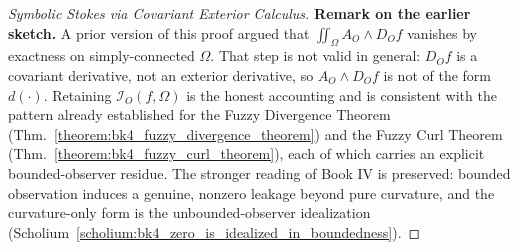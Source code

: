 \begin{proof}[Symbolic Stokes via Covariant Exterior Calculus]
\textbf{Remark on the earlier sketch.} A prior version of this proof argued that $\iint_\Omega A_O \wedge D_O f$ vanishes by exactness on simply-connected $\Omega$. That step is not valid in general: $D_O f$ is a covariant derivative, not an exterior derivative, so $A_O \wedge D_O f$ is not of the form $d(\cdot)$. Retaining $\mathcal{I}_O(f,\Omega)$ is the honest accounting and is consistent with the pattern already established for the Fuzzy Divergence Theorem (Thm.~\ref{theorem:bk4_fuzzy_divergence_theorem}) and the Fuzzy Curl Theorem (Thm.~\ref{theorem:bk4_fuzzy_curl_theorem}), each of which carries an explicit bounded-observer residue. The stronger reading of Book IV is preserved: bounded observation induces a genuine, nonzero leakage beyond pure curvature, and the curvature-only form is the unbounded-observer idealization (Scholium~\ref{scholium:bk4_zero_is_idealized_in_boundedness}).
\end{proof}

